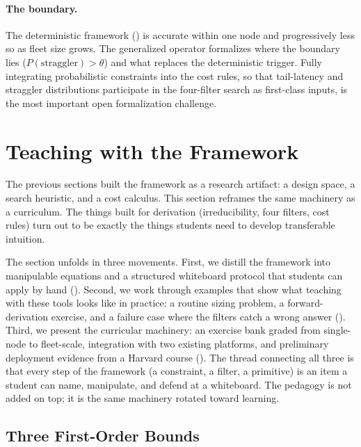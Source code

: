 \documentclass[10pt,twocolumn]{article}
\begin{document}
\paragraph{The boundary.} The deterministic framework () is accurate within one node and progressively less so as fleet size grows. The generalized operator formalizes where the boundary lies ($P(\text{straggler}) > \theta$) and what replaces the deterministic trigger. Fully integrating probabilistic constraints into the cost rules, so that tail-latency and straggler distributions participate in the four-filter search as first-class inputs, is the most important open formalization challenge.

\section{Teaching with the Framework}
\label{sec:teaching}

The previous sections built the framework as a research artifact: a design space, a search heuristic, and a cost calculus. This section reframes the same machinery as a curriculum. The things built for derivation (irreducibility, four filters, cost rules) turn out to be exactly the things students need to develop transferable intuition.

The section unfolds in three movements. First, we distill the framework into manipulable equations and a structured whiteboard protocol that students can apply by hand (). Second, we work through examples that show what teaching with these tools looks like in practice: a routine sizing problem, a forward-derivation exercise, and a failure case where the filters catch a wrong answer (). Third, we present the curricular machinery: an exercise bank graded from single-node to fleet-scale, integration with two existing platforms, and preliminary deployment evidence from a Harvard course (). The thread connecting all three is that every step of the framework (a constraint, a filter, a primitive) is an item a student can name, manipulate, and defend at a whiteboard. The pedagogy is not added on top; it is the same machinery rotated toward learning.

\subsection{Three First-Order Bounds}
\label{sec:iron-laws}
\end{document}
